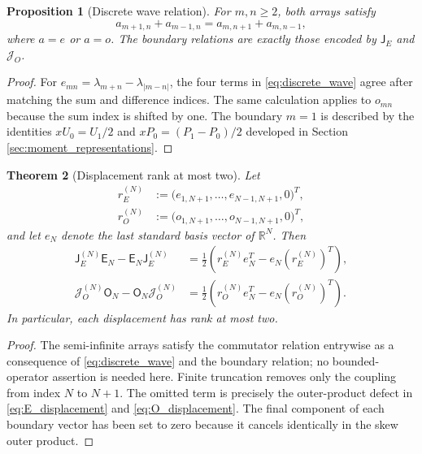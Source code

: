 \documentclass[11pt]{amsart}
\numberwithin{equation}{section}
\theoremstyle{plain}
\newtheorem{theorem}{Theorem}[section]
\newtheorem{proposition}[theorem]{Proposition}
\theoremstyle{definition}
\theoremstyle{remark}
\newcommand{\E}{\mathsf E}
\newcommand{\Omat}{\mathsf O}
\newcommand{\J}{\mathsf J}
\begin{document}
\begin{proposition}[Discrete wave relation]
\label{prop:discrete_wave}
For $m,n\ge2$, both arrays satisfy
\begin{equation}
a_{m+1,n}+a_{m-1,n}
=a_{m,n+1}+a_{m,n-1},
\label{eq:discrete_wave}
\end{equation}
where $a=e$ or $a=o$. The boundary relations are exactly those encoded by $\J_E$ and $\mathcal J_O$.
\end{proposition}

\begin{proof}
For $e_{mn}=\lambda_{m+n}-\lambda_{|m-n|}$, the four terms in \eqref{eq:discrete_wave} agree after matching the sum and difference indices. The same calculation applies to $o_{mn}$ because the sum index is shifted by one. The boundary $m=1$ is described by the identities $xU_0=U_1/2$ and $xP_0=(P_1-P_0)/2$ developed in Section \ref{sec:moment_representations}.
\end{proof}

\begin{theorem}[Displacement rank at most two]
\label{thm:rank_two_displacement}
Let
\begin{align}
r_E^{(N)}&:=\bigl(e_{1,N+1},\dots,e_{N-1,N+1},0\bigr)^T,
\label{eq:rE_definition}\\
r_O^{(N)}&:=\bigl(o_{1,N+1},\dots,o_{N-1,N+1},0\bigr)^T,
\label{eq:rO_definition}
\end{align}
and let $e_N$ denote the last standard basis vector of $\mathbb R^N$. Then
\begin{align}
\J_E^{(N)}\E_N-\E_N\J_E^{(N)}
&=\frac12\left(r_E^{(N)}e_N^T-e_N(r_E^{(N)})^T\right),
\label{eq:E_displacement}\\
\mathcal J_O^{(N)}\Omat_N-\Omat_N\mathcal J_O^{(N)}
&=\frac12\left(r_O^{(N)}e_N^T-e_N(r_O^{(N)})^T\right).
\label{eq:O_displacement}
\end{align}
In particular, each displacement has rank at most two.
\end{theorem}

\begin{proof}
The semi-infinite arrays satisfy the commutator relation entrywise as a consequence of \eqref{eq:discrete_wave} and the boundary relation; no bounded-operator assertion is needed here. Finite truncation removes only the coupling from index $N$ to $N+1$. The omitted term is precisely the outer-product defect in \eqref{eq:E_displacement} and \eqref{eq:O_displacement}. The final component of each boundary vector has been set to zero because it cancels identically in the skew outer product.
\end{proof}
\end{document}
